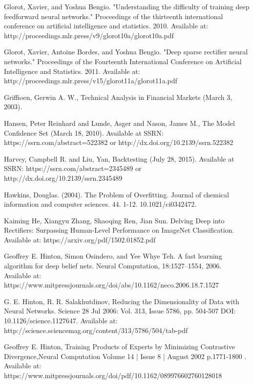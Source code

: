 \documentclass[a4paper,latin]{paper}
\begin{document}
\begin{thebibliography}{bibliography}
Glorot, Xavier, and Yoshua Bengio. "Understanding the difficulty of training deep feedforward neural networks." Proceedings of the thirteenth international conference on artificial intelligence and statistics. 2010.
Available at: http://proceedings.mlr.press/v9/glorot10a/glorot10a.pdf

Glorot, Xavier, Antoine Bordes, and Yoshua Bengio. "Deep sparse rectifier neural networks." Proceedings of the Fourteenth International Conference on Artificial Intelligence and Statistics. 2011.
Available at: http://proceedings.mlr.press/v15/glorot11a/glorot11a.pdf 

Griffioen, Gerwin A. W., Technical Analysis in Financial Markets (March 3, 2003).

Hansen, Peter Reinhard and Lunde, Asger and Nason, James M., The Model Confidence Set (March 18, 2010). Available at SSRN: https://ssrn.com/abstract=522382 or http://dx.doi.org/10.2139/ssrn.522382

Harvey, Campbell R. and Liu, Yan, Backtesting (July 28, 2015). Available at SSRN: https://ssrn.com/abstract=2345489 or http://dx.doi.org/10.2139/ssrn.2345489

Hawkins, Douglas. (2004). The Problem of Overfitting. Journal of chemical information and computer sciences. 44. 1-12. 10.1021/ci0342472. 

Kaiming He,  Xiangyu Zhang,  Shaoqing Ren,  Jian Sun. Delving Deep into Rectifiers: Surpassing Human-Level Performance on ImageNet Classification. Available at: https://arxiv.org/pdf/1502.01852.pdf

Geoffrey E. Hinton, Simon Osindero, and Yee Whye Teh. A fast learning algorithm for deep belief nets. Neural Computation, 18:1527–1554, 2006. 
Available at: https://www.mitpressjournals.org/doi/abs/10.1162/neco.2006.18.7.1527

G. E. Hinton, R. R. Salakhutdinov, Reducing the Dimensionality of Data with Neural 
Networks. Science  28 Jul 2006: Vol. 313, Issue 5786, pp. 504-507 DOI: 
10.1126/science.1127647. Available at: http://science.sciencemag.org/content/313/5786/504/tab-pdf

Geoffrey E. Hinton, Training Products of Experts by Minimizing Contrastive Divergence,Neural Computation
Volume 14 | Issue 8 | August 2002  p.1771-1800 . Available at: https://www.mitpressjournals.org/doi/pdf/10.1162/089976602760128018


\end{thebibliography}
\end{document}
